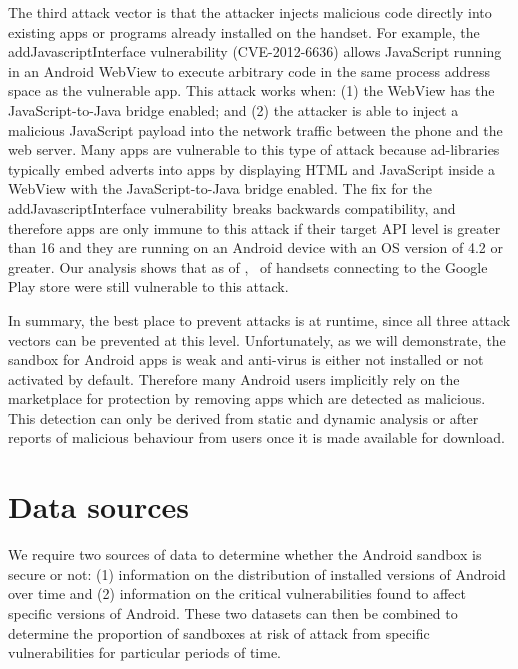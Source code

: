 \documentclass{llncs}
\let\OldTodo\todo
\renewcommand{\todo}{\OldTodo}%
\begin{document}
The third attack vector is that the attacker injects malicious code directly into existing apps or programs already installed on the handset. 
For example, the addJavascriptInterface vulnerability (CVE-2012-6636) allows JavaScript running in an Android WebView to execute arbitrary code in the same process address space as the vulnerable app.
This attack works when: (1) the WebView has the JavaScript-to-Java bridge enabled; and (2) the attacker is able to inject a malicious JavaScript payload into the network traffic between the phone and the web server. 
Many apps are vulnerable to this type of attack because ad-libraries typically embed adverts into apps by displaying HTML and JavaScript inside a WebView with the JavaScript-to-Java bridge enabled. 
The fix for the addJavascriptInterface vulnerability breaks backwards compatibility, and therefore apps are only immune to this attack if their target API level is greater than 16 and they are running on an Android device with an OS version of 4.2 or greater.
Our analysis shows that as of \daGPAPISeventeenLaterDate, \daGPAPISeventeenEarlierProportion\ of handsets connecting to the Google Play store were still vulnerable to this attack.

In summary, the best place to prevent attacks is at runtime, since all three attack vectors can be prevented at this level. 
Unfortunately, as we will demonstrate, the sandbox for Android apps is weak and anti-virus is either not installed or not activated by default.
Therefore many Android users implicitly rely on the marketplace for protection by removing apps which are detected as malicious. This detection can only be derived from static and dynamic analysis or after reports of malicious behaviour from users once it is made available for download.

\section{Data sources}
\label{sec:background}

We require two sources of data to determine whether the Android sandbox is secure or not: (1) information on the distribution of installed versions of Android over time and (2) information on the critical vulnerabilities found to affect specific versions of Android.
These two datasets can then be combined to determine the proportion of sandboxes at risk of attack from specific vulnerabilities for particular periods of time.
\end{document}

